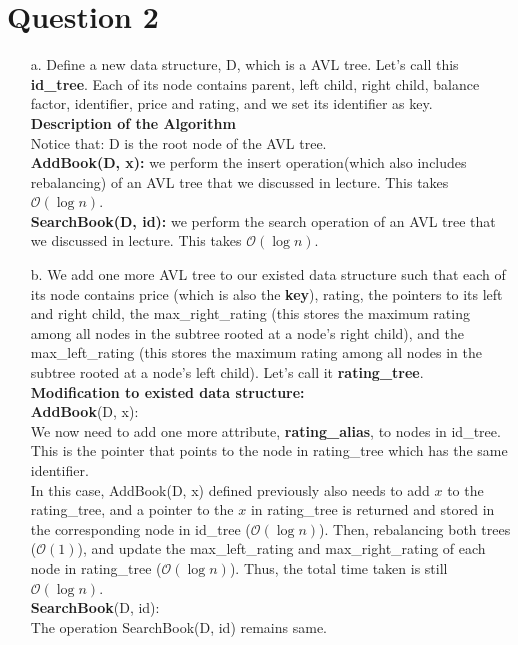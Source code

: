 \documentclass[10pt]{article}
\begin{document}
\section*{Question 2}
\begin{enumerate}
\item[a.]
Define a new data structure, D, which is a AVL tree. Let's call this \textbf{id\_tree}. Each of its node contains parent, left child, right child, balance factor, identifier, price and rating, and we set its identifier as key.\\
\textbf{Description of the Algorithm}\\
Notice that: D is the root node of the AVL tree.\\
\textbf{AddBook(D, x):} we perform the insert operation(which also includes rebalancing) of an AVL tree that we discussed in lecture. This takes $\mathcal{O}(\log{}n)$.\\
\textbf{SearchBook(D, id):} we perform the search operation of an AVL tree that we discussed in lecture. This takes $\mathcal{O}(\log{}n)$.\\
\item[b.]
We add one more AVL tree to our existed data structure such that each of its node contains price (which is also the \textbf{key}), rating, the pointers to its left and right child, the max\_right\_rating (this stores the maximum rating among all nodes in the subtree rooted at a node's right child), and the max\_left\_rating (this stores the maximum rating among all nodes in the subtree rooted at a node's left child). Let's call it \textbf{rating\_tree}.\\
\textbf{Modification to existed data structure:}\\
\textbf{AddBook}(D, x):\\
We now need to add one more attribute, \textbf{rating\_alias}, to nodes in id\_tree. This is the pointer that points to the node in rating\_tree which has the same identifier.\\
In this case, AddBook(D, x) defined previously also needs to add $x$ to the rating\_tree, and a pointer to the $x$ in rating\_tree is returned and stored in the corresponding node in id\_tree ($\mathcal{O}(\log{}n)$). Then, rebalancing both trees ($\mathcal{O}(1)$), and update the max\_left\_rating and max\_right\_rating of each node in rating\_tree ($\mathcal{O}(\log{}n)$). Thus, the total time taken is still $\mathcal{O}(\log{}n)$.\\
\textbf{SearchBook}(D, id):\\
The operation SearchBook(D, id) remains same.\\

\end{enumerate}
\end{document}
